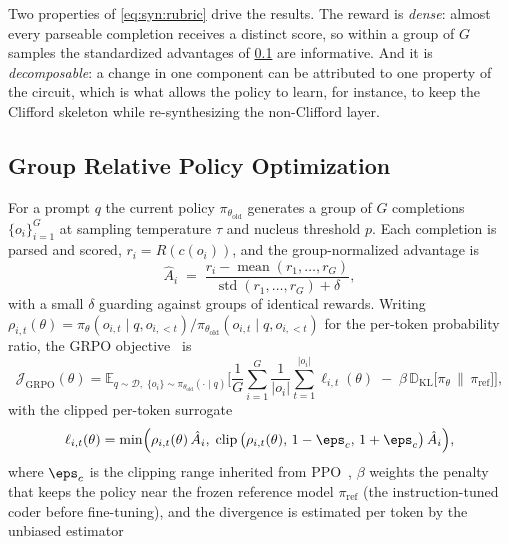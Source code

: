 Two properties of \cref{eq:syn:rubric} drive the results. The reward is \emph{dense}: almost every parseable completion receives a distinct score, so within a group of $G$ samples the standardized advantages of \cref{sec:syn:grpo} are informative. And it is \emph{decomposable}: a change in one component can be attributed to one property of the circuit, which is what allows the policy to learn, for instance, to keep the Clifford skeleton while re-synthesizing the non-Clifford layer.

\subsection{Group Relative Policy Optimization}\label{sec:syn:grpo}

For a prompt $q$ the current policy $\pi_{\theta_{\mathrm{old}}}$ generates a group of $G$ completions $\{o_i\}_{i=1}^{G}$ at sampling temperature $\tau$ and nucleus threshold $p$. Each completion is parsed and scored, $r_i=R(c(o_i))$, and the group-normalized advantage is
\begin{equation}\label{eq:syn:adv}
  \hat A_i \;=\; \frac{r_i-\operatorname{mean}(r_1,\dots,r_G)}{\operatorname{std}(r_1,\dots,r_G)+\delta},
\end{equation}
with a small $\delta$ guarding against groups of identical rewards. Writing $\rho_{i,t}(\theta)=\pi_\theta(o_{i,t}\mid q,o_{i,<t})/\pi_{\theta_{\mathrm{old}}}(o_{i,t}\mid q,o_{i,<t})$ for the per-token probability ratio, the GRPO objective~\cite{shao2024deepseekmath} is
\begin{equation}\label{eq:syn:grpo}
  \mathcal{J}_{\mathrm{GRPO}}(\theta)=
  \mathbb{E}_{q\sim\mathcal{D},\;\{o_i\}\sim\pi_{\theta_{\mathrm{old}}}(\cdot\mid q)}
  \Bigg[\frac{1}{G}\sum_{i=1}^{G}\frac{1}{|o_i|}\sum_{t=1}^{|o_i|}\ell_{i,t}(\theta)
  \;-\;\beta\, \mathbb{D}_{\mathrm{KL}}\big[\pi_\theta\,\big\|\,\pi_{\mathrm{ref}}\big]\Bigg],
\end{equation}
with the clipped per-token surrogate
\begin{equation}\label{eq:syn:clip}
  \ell_{i,t}(\theta)=\min\!\Big(\rho_{i,t}(\theta)\,\hat A_i,\;
  \operatorname{clip}\big(\rho_{i,t}(\theta),\,1-\eps_{c},\,1+\eps_{c}\big)\,\hat A_i\Big),
\end{equation}
where $\eps_c$ is the clipping range inherited from PPO~\cite{schulman2017ppo}, $\beta$ weights the penalty that keeps the policy near the frozen reference model $\pi_{\mathrm{ref}}$ (the instruction-tuned coder before fine-tuning), and the divergence is estimated per token by the unbiased estimator
